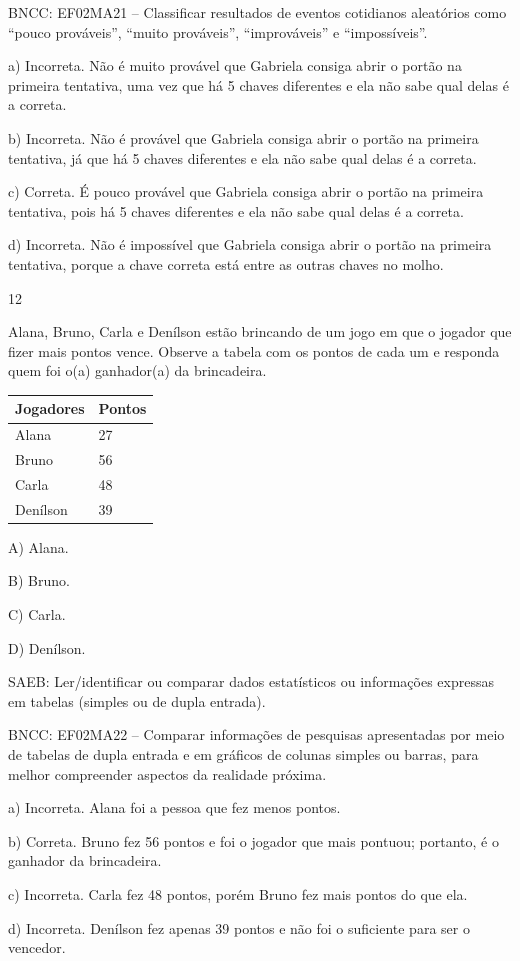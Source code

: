 \begin{escolha}
\begin{escolha}
{{{{BNCC: EF02MA21 -- Classificar resultados de eventos cotidianos aleatórios
como ``pouco prováveis'', ``muito prováveis'', ``improváveis'' e ``impossíveis''.

a) Incorreta. Não é muito provável que Gabriela consiga abrir o portão
na primeira tentativa, uma vez que há 5 chaves diferentes e ela não sabe
qual delas é a correta.

b) Incorreta. Não é provável que Gabriela consiga abrir o portão na
primeira tentativa, já que há 5 chaves diferentes e ela não sabe qual
delas é a correta.

c) Correta. É pouco provável que Gabriela consiga abrir o portão na
primeira tentativa, pois há 5 chaves diferentes e ela não sabe qual
delas é a correta.

d) Incorreta. Não é impossível que Gabriela consiga abrir o portão na
primeira tentativa, porque a chave correta está entre as outras chaves
no molho.

\num{12}

Alana, Bruno, Carla e Denílson estão brincando de um jogo em que o
jogador que fizer mais pontos vence. Observe a tabela com os pontos de
cada um e responda quem foi o(a) ganhador(a) da brincadeira.

\begin{longtable}[]{@{}ll@{}}
\toprule
Jogadores & Pontos\tabularnewline
\midrule
\endhead
Alana & 27\tabularnewline
Bruno & 56\tabularnewline
Carla & 48\tabularnewline
Denílson & 39\tabularnewline
\bottomrule
\end{longtable}

A) Alana.

B) Bruno.

C) Carla.

D) Denílson.

SAEB: Ler/identificar ou comparar dados estatísticos ou
informações expressas em tabelas (simples ou de dupla entrada).

BNCC: EF02MA22 -- Comparar informações de pesquisas apresentadas por meio
de tabelas de dupla entrada e em gráficos de colunas simples ou barras,
para melhor compreender aspectos da realidade próxima.

a) Incorreta. Alana foi a pessoa que fez menos pontos.

b) Correta. Bruno fez 56 pontos e foi o jogador que mais pontuou;
portanto, é o ganhador da brincadeira.

c) Incorreta. Carla fez 48 pontos, porém Bruno fez mais pontos do que ela.

d) Incorreta. Denílson fez apenas 39 pontos e não foi o suficiente para ser o vencedor.

}}}}
\end{escolha}
\end{escolha}
